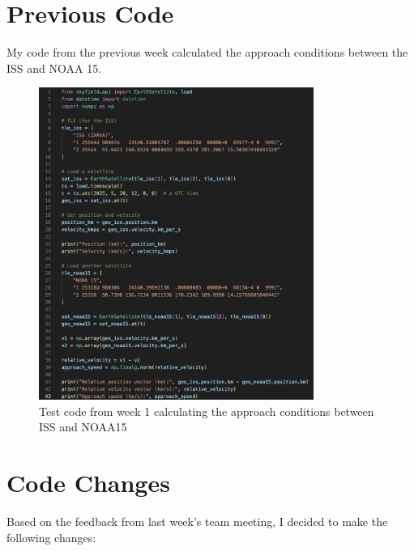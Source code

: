 \documentclass[12pt]{report}
\begin{document}
\chapter*{Previous Code}
My code from the previous week calculated the approach conditions between the ISS and NOAA 15.
\begin{figure}[H]
    \centering
    \includegraphics[width=0.8\textwidth]{figure_week_1_test_code.png}
    \caption{Test code from week 1 calculating the approach conditions between ISS and NOAA15}
    \label{fig:orbit}
\end{figure}

\chapter*{Code Changes}

Based on the feedback from last week’s team meeting, I decided to make the following changes:
\end{document}
